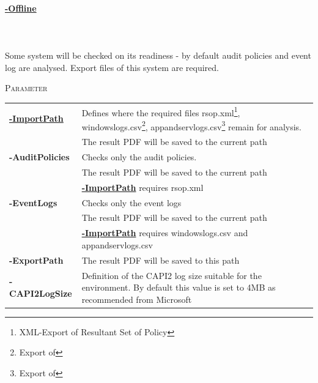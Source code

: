 \begin{tcolorbox}
    \paragraph{\underline{-Offline}} \ \\\\ Some system will be checked on its readiness - by default audit policies and event log are analysed. Export files of this system are required.
    \vspace{0.3cm}
    \begin{center}
        \textsc{Parameter}
    \end{center}
    \vspace{-0.5cm}
    \begin{table}[H]
        \def\arraystretch{2}
        \centering
        \begin{tabular}{ p{4cm}  p{10cm} }  \hline
            \textbf{\underline{-ImportPath}} & Defines where the required files rsop.xml\footnote{XML-Export of Resultant Set of Policy}, windowslogs.csv\footnote{Export of }, appandservlogs.csv\footnote{Export of } remain for analysis. \\ 
            & The result PDF will be saved to the current path \\ \hline
            \textbf{-AuditPolicies} & Checks only the audit policies. \\
            & The result PDF will be saved to the current path \\ 
            & \textbf{\underline{-ImportPath}} requires rsop.xml \\\hline
            \textbf{-EventLogs} & Checks only the event logs \\
            & The result PDF will be saved to the current path \\ 
            & \textbf{\underline{-ImportPath}} requires windowslogs.csv and appandservlogs.csv\\\hline
            \textbf{-ExportPath} & The result PDF will be saved to this path \\ \hline
            \textbf{-CAPI2LogSize} & Definition of the CAPI2 log size suitable for the environment. By default this value is set to 4MB as recommended from Microsoft  \\ \hline
        \end{tabular}
    \end{table}
\end{tcolorbox}

